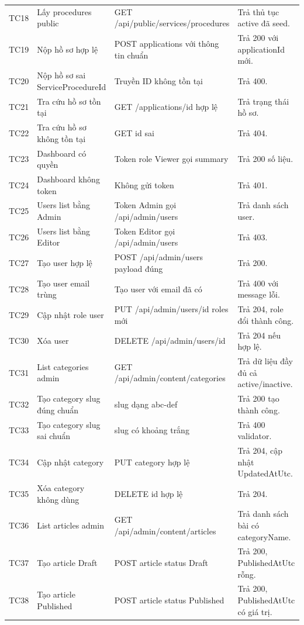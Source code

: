 \documentclass[12pt,a4paper]{article}
\begin{document}
\begin{longtable}{p{1.2cm}p{3.2cm}p{4.7cm}p{4.2cm}}
TC18 & Lấy procedures public & GET /api/public/services/procedures & Trả thủ tục active đã seed. \\
TC19 & Nộp hồ sơ hợp lệ & POST applications với thông tin chuẩn & Trả 200 với applicationId mới. \\
TC20 & Nộp hồ sơ sai ServiceProcedureId & Truyền ID không tồn tại & Trả 400. \\
TC21 & Tra cứu hồ sơ tồn tại & GET /applications/{id} hợp lệ & Trả trạng thái hồ sơ. \\
TC22 & Tra cứu hồ sơ không tồn tại & GET id sai & Trả 404. \\
TC23 & Dashboard có quyền & Token role Viewer gọi summary & Trả 200 số liệu. \\
TC24 & Dashboard không token & Không gửi token & Trả 401. \\
TC25 & Users list bằng Admin & Token Admin gọi /api/admin/users & Trả danh sách user. \\
TC26 & Users list bằng Editor & Token Editor gọi /api/admin/users & Trả 403. \\
TC27 & Tạo user hợp lệ & POST /api/admin/users payload đúng & Trả 200. \\
TC28 & Tạo user email trùng & Tạo user với email đã có & Trả 400 với message lỗi. \\
TC29 & Cập nhật role user & PUT /api/admin/users/{id} roles mới & Trả 204, role đổi thành công. \\
TC30 & Xóa user & DELETE /api/admin/users/{id} & Trả 204 nếu hợp lệ. \\
TC31 & List categories admin & GET /api/admin/content/categories & Trả dữ liệu đầy đủ cả active/inactive. \\
TC32 & Tạo category slug đúng chuẩn & slug dạng abc-def & Trả 200 tạo thành công. \\
TC33 & Tạo category slug sai chuẩn & slug có khoảng trắng & Trả 400 validator. \\
TC34 & Cập nhật category & PUT category hợp lệ & Trả 204, cập nhật UpdatedAtUtc. \\
TC35 & Xóa category không dùng & DELETE id hợp lệ & Trả 204. \\
TC36 & List articles admin & GET /api/admin/content/articles & Trả danh sách bài có categoryName. \\
TC37 & Tạo article Draft & POST article status Draft & Trả 200, PublishedAtUtc rỗng. \\
TC38 & Tạo article Published & POST article status Published & Trả 200, PublishedAtUtc có giá trị. \\

\end{longtable}
\end{document}
